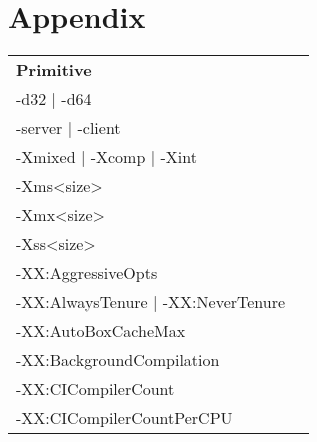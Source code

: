 \documentclass[
  digital, %
  oneside,
  notable, %
  nolof,     %
  nolot     %
]{fithesis3}
\begin{document}
\chapter{Appendix}
\begin{table}[]
	\centering
	\begin{tabular}{ll}
	\cline{1-1}
	\multicolumn{1}{|l|}{\textbf{Primitive}}                         &                                                             \\ \cline{1-1}
	\multicolumn{1}{|l|}{-d32 | -d64}                                &                                                             \\ \cline{1-1}
	\multicolumn{1}{|l|}{-server | -client}                          &                                                             \\ \cline{1-1}
	\multicolumn{1}{|l|}{-Xmixed | -Xcomp | -Xint}                   &                                                             \\ \cline{1-1}
	\multicolumn{1}{|l|}{-Xms\textless size\textgreater}              &                                                             \\ \cline{1-1}
	\multicolumn{1}{|l|}{-Xmx\textless size\textgreater}              &                                                             \\ \cline{1-1}
	\multicolumn{1}{|l|}{-Xss\textless size\textgreater}              &                                                             \\ \cline{1-1}
	\multicolumn{1}{|l|}{-XX:AggressiveOpts}                         &                                                             \\ \cline{1-1}
	\multicolumn{1}{|l|}{-XX:AlwaysTenure | -XX:NeverTenure}         &                                                             \\ \cline{1-1}
	\multicolumn{1}{|l|}{-XX:AutoBoxCacheMax}                        &                                                             \\ \cline{1-1}
	\multicolumn{1}{|l|}{-XX:BackgroundCompilation}                  &                                                             \\ \cline{1-1}
	\multicolumn{1}{|l|}{-XX:CICompilerCount}                        &                                                             \\ \cline{1-1}
	\multicolumn{1}{|l|}{-XX:CICompilerCountPerCPU}                  &                                                             \\ \cline{1-1}

\end{tabular}
\end{table}
\end{document}

